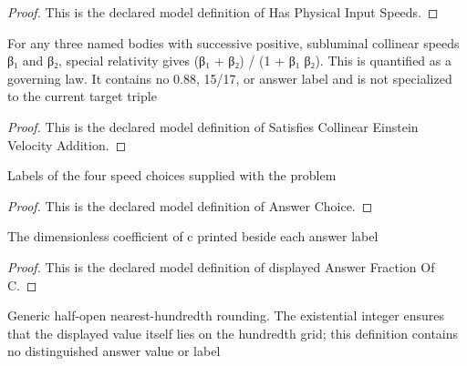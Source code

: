 \begin{proof}
  This is the declared model definition of Has Physical Input Speeds.
\end{proof}
\begin{definition}
  \label{def:physics:phyx-mini-0621:phyxminiproblems-problemphyxmini0621-satisfiescollineareinsteinvelocityaddition}
  For any three named bodies with successive positive, subluminal collinear speeds β₁ and β₂, special relativity gives (β₁ + β₂) / (1 + β₁ β₂). This is quantified as a governing law. It contains no 0.88, 15/17, or answer label and is not specialized to the current target triple
\end{definition}
\begin{proof}
  This is the declared model definition of Satisfies Collinear Einstein Velocity Addition.
\end{proof}
\begin{definition}
  \label{def:physics:phyx-mini-0621:phyxminiproblems-problemphyxmini0621-answerchoice}
  Labels of the four speed choices supplied with the problem
\end{definition}
\begin{proof}
  This is the declared model definition of Answer Choice.
\end{proof}
\begin{definition}
  \label{def:physics:phyx-mini-0621:phyxminiproblems-problemphyxmini0621-displayedanswerfractionofc}
  The dimensionless coefficient of c printed beside each answer label
\end{definition}
\begin{proof}
  This is the declared model definition of displayed Answer Fraction Of C.
\end{proof}
\begin{definition}
  \label{def:physics:phyx-mini-0621:phyxminiproblems-problemphyxmini0621-roundstonearesthundredth}
  Generic half-open nearest-hundredth rounding. The existential integer ensures that the displayed value itself lies on the hundredth grid; this definition contains no distinguished answer value or label
\end{definition}
